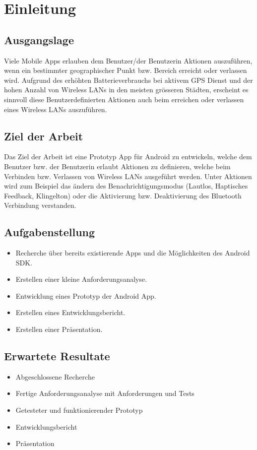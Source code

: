 \chapter{Einleitung}
\label{sec:Einleitung}

\section{Ausgangslage}
\label{sec:Ausgangslage}

Viele Mobile Apps erlauben dem Benutzer/der Benutzerin Aktionen auszuführen, wenn ein bestimmter geographischer Punkt bzw. Bereich erreicht oder verlassen wird. Aufgrund des erhöhten Batterieverbrauchs bei aktivem GPS Dienst und der hohen Anzahl von Wireless LANs in den meisten grösseren Städten, erscheint es sinnvoll diese Benutzerdefinierten Aktionen auch beim erreichen oder verlassen eines Wireless LANs auszuführen.

\section{Ziel der Arbeit}
\label{sec:zielderarbeit}
Das Ziel der Arbeit ist eine Prototyp App für Android zu entwickeln, welche dem Benutzer bzw. der Benutzerin erlaubt Aktionen zu definieren, welche beim Verbinden bzw. Verlassen von Wireless LANs ausgeführt werden. Unter Aktionen wird zum Beispiel das ändern des Benachrichtigungsmodus (Lautlos, Haptisches Feedback, Klingelton) oder die Aktivierung bzw. Deaktivierung des Bluetooth Verbindung verstanden.

\section{Aufgabenstellung}
\label{sec:aufgabenstellung}
\begin{itemize}
  \item Recherche über bereits existierende Apps und die Möglichkeiten des Android SDK.
  \item Erstellen einer kleine Anforderungsanalyse.
  \item Entwicklung eines Prototyp der Android App.
  \item Erstellen eines Entwicklungsbericht.
  \item Erstellen einer Präsentation.
\end{itemize}

\section{Erwartete Resultate}
\label{sec:erwarteteresultate}
\begin{itemize}
  \item Abgeschlossene Recherche
  \item Fertige Anforderungsanalyse mit Anforderungen und Tests
  \item Getesteter und funktionierender Prototyp
  \item Entwicklungsbericht
  \item Präsentation
\end{itemize}